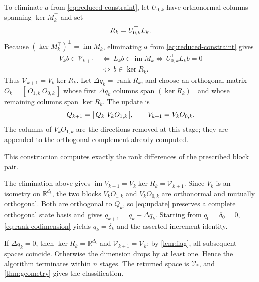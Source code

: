 \documentclass[twocolumn]{autart}
\begin{document}
To eliminate $a$ from \cref{eq:reduced-constraint}, let $U_{0,k}$ have
orthonormal columns spanning $\ker M_k^\top$ and set\vspace{-2mm}
\begin{equation}\label{eq:residual}
R_k=U_{0,k}^\top L_k.\vspace{-2mm}
\end{equation}
Because $(\ker M_k^\top)^\perp=\operatorname{im}M_k$, eliminating $a$ from \cref{eq:reduced-constraint} gives\vspace{-2mm}
\begin{align*}
V_kb\in\mathcal V_{k+1}
&\,\Longleftrightarrow\, L_kb\in\operatorname{im}M_k \Longleftrightarrow\, U_{0,k}^\top L_kb=0\\
&\,\Longleftrightarrow\, b\in\ker R_k.
\end{align*}
Thus $\mathcal V_{k+1}=V_k\ker R_k$. Let
$\Delta q_k=\operatorname{rank}R_k$, and choose an orthogonal matrix
$O_k=[\,O_{1,k}\ O_{0,k}\,]$ whose first $\Delta q_k$ columns span
$(\ker R_k)^\perp$ and whose remaining columns span $\ker R_k$. The
update is\vspace{-2mm}
\begin{equation}\label{eq:update}
Q_{k+1}=[\,Q_k\ V_kO_{1,k}\,],\qquad
V_{k+1}=V_kO_{0,k}.\vspace{-2mm}
\end{equation}
The columns of $V_kO_{1,k}$ are the directions removed at this stage;
they are appended to the orthogonal complement already computed.

This construction computes exactly the rank differences of the prescribed
block pair.


\vspace{-2mm}

\begin{pf}
The elimination above gives
$\operatorname{im}V_{k+1}=V_k\ker R_k=\mathcal V_{k+1}$. Since $V_k$
is an isometry on $\mathbb R^{d_k}$, the two blocks $V_kO_{1,k}$ and
$V_kO_{0,k}$ are orthonormal and mutually orthogonal. Both are orthogonal
to $Q_k$, so \cref{eq:update} preserves a complete orthogonal state basis
and gives $q_{k+1}=q_k+\Delta q_k$. Starting from
$q_0=\delta_0=0$, \cref{eq:rank-codimension} yields $q_k=\delta_k$ and
the asserted increment identity.

If $\Delta q_k=0$, then $\ker R_k=\mathbb R^{d_k}$ and
$\mathcal V_{k+1}=\mathcal V_k$; by \cref{lem:flag}, all subsequent
spaces coincide. Otherwise the dimension drops by at least one. Hence the
algorithm terminates within $n$ stages. The returned space is
$\mathcal V_*$, and \cref{thm:geometry} gives the classification.
\end{pf}
\end{document}
